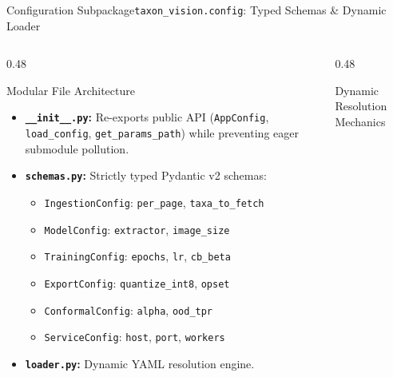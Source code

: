 \begin{frame}{Configuration Subpackage}{\texttt{taxon\_vision.config}: Typed Schemas \& Dynamic Loader}
    \begin{columns}[T]
        \begin{column}{0.48\textwidth}
            \begin{block}{Modular File Architecture}
                \begin{itemize}\scriptsize
                    \item \textbf{\texttt{\_\_init\_\_.py}:} Re-exports public API (\texttt{AppConfig}, \texttt{load\_config}, \texttt{get\_params\_path}) while preventing eager submodule pollution.
                    \item \textbf{\texttt{schemas.py}:} Strictly typed Pydantic v2 schemas:
                        \begin{itemize}\tiny
                            \item \texttt{IngestionConfig}: \texttt{per\_page}, \texttt{taxa\_to\_fetch}
                            \item \texttt{ModelConfig}: \texttt{extractor}, \texttt{image\_size}
                            \item \texttt{TrainingConfig}: \texttt{epochs}, \texttt{lr}, \texttt{cb\_beta}
                            \item \texttt{ExportConfig}: \texttt{quantize\_int8}, \texttt{opset}
                            \item \texttt{ConformalConfig}: \texttt{alpha}, \texttt{ood\_tpr}
                            \item \texttt{ServiceConfig}: \texttt{host}, \texttt{port}, \texttt{workers}
                        \end{itemize}
                    \item \textbf{\texttt{loader.py}:} Dynamic YAML resolution engine.
                \end{itemize}
            \end{block}
        \end{column}
        \begin{column}{0.48\textwidth}
            \begin{block}{Dynamic Resolution Mechanics}
                \begin{itemize}\scriptsize

\end{itemize}
\end{block}
\end{column}
\end{columns}
\end{frame}
